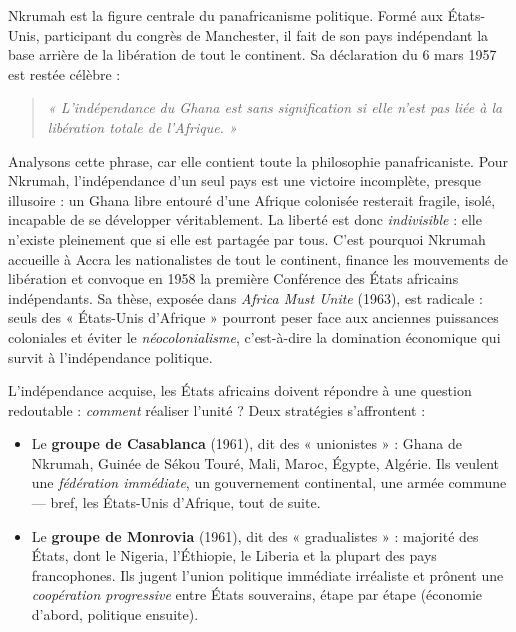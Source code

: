 \documentclass[11pt]{article}
\newcommand{\cle}[1]{{\popxbold\color{popdark}#1}}
\newcounter{popsec}
\newcounter{popsub}
\newcommand{\courssub}[1]{%
  \stepcounter{popsub}%
  \par\vspace{9pt}\noindent{\popxbold\fontsize{11.5}{13}\selectfont\color{popink}{\color{poporange}\thepopsec.\thepopsub}\hspace{6pt}#1}\par\nopagebreak\vspace{4pt}
}
\begin{document}
Nkrumah est la figure centrale du panafricanisme politique. Formé aux États-Unis, participant du congrès de Manchester, il fait de son pays indépendant la base arrière de la libération de tout le continent. Sa déclaration du 6 mars 1957 est restée célèbre :

\begin{quote}
\emph{« L'indépendance du Ghana est sans signification si elle n'est pas liée à la libération totale de l'Afrique. »}
\end{quote}

Analysons cette phrase, car elle contient toute la philosophie panafricaniste. Pour Nkrumah, l'indépendance d'un seul pays est une victoire incomplète, presque illusoire : un Ghana libre entouré d'une Afrique colonisée resterait fragile, isolé, incapable de se développer véritablement. La liberté est donc \emph{indivisible} : elle n'existe pleinement que si elle est partagée par tous. C'est pourquoi Nkrumah accueille à Accra les nationalistes de tout le continent, finance les mouvements de libération et convoque en 1958 la première Conférence des États africains indépendants. Sa thèse, exposée dans \emph{Africa Must Unite} (1963), est radicale : seuls des « États-Unis d'Afrique » pourront peser face aux anciennes puissances coloniales et éviter le \emph{néocolonialisme}, c'est-à-dire la domination économique qui survit à l'indépendance politique.

\courssub{la création de l'OUA à Addis-Abeba}

L'indépendance acquise, les États africains doivent répondre à une question redoutable : \emph{comment} réaliser l'unité ? Deux stratégies s'affrontent :

\begin{itemize}
\item Le \textbf{groupe de Casablanca} (1961), dit des « \cle{unionistes} » : Ghana de Nkrumah, Guinée de Sékou Touré, Mali, Maroc, Égypte, Algérie. Ils veulent une \emph{fédération immédiate}, un gouvernement continental, une armée commune — bref, les États-Unis d'Afrique, tout de suite.
\item Le \textbf{groupe de Monrovia} (1961), dit des « \cle{gradualistes} » : majorité des États, dont le Nigeria, l'Éthiopie, le Liberia et la plupart des pays francophones. Ils jugent l'union politique immédiate irréaliste et prônent une \emph{coopération progressive} entre États souverains, étape par étape (économie d'abord, politique ensuite).
\end{itemize}
\end{document}
